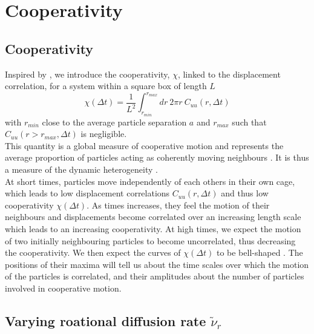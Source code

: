 \documentclass[class=report, float=false, crop=false]{standalone}
\begin{document}
\section{Cooperativity}
\label{section:cooperativity}

\subsection{Cooperativity}

Inspired by \cite{wysocki2014cooperative, doliwa2000cooperativity}, we introduce the cooperativity, $\chi$, linked to the displacement correlation, for a system within a square box of length $L$
\begin{equation}
\chi(\Delta t) = \frac{1}{L^2} \int_{r_{min}}^{r_{max}} dr~ 2\pi r~ C_{uu}(r, \Delta t)
\label{chi}
\end{equation}
with $r_{min}$ close to the average particle separation $a$ and $r_{max}$ such that $C_{uu}(r > r_{max}, \Delta t)$ is negligible.\\

This quantity is a global measure of cooperative motion and represents the average proportion of particles acting as coherently moving neighbours \cite{doliwa2000cooperativity}. It is thus a measure of the dynamic heterogeneity \cite{cavagna2009supercooled}.\\

At short times, particles move independently of each others in their own cage, which leads to low displacement correlations $C_{uu}(r, \Delta t)$ and thus low cooperativity $\chi(\Delta t)$. As times increases, they feel the motion of their neighbours and displacements become correlated over an increasing length scale which leads to an increasing cooperativity. At high times, we expect the motion of two initially neighbouring particles to become uncorrelated, thus decreasing the cooperativity. We then expect the curves of $\chi(\Delta t)$ to be bell-shaped \cite{wysocki2014cooperative, cavagna2009supercooled}. The positions of their maxima will tell us about the time scales over which the motion of the particles is correlated, and their amplitudes about the number of particles involved in cooperative motion.

\subsection{Varying roational diffusion rate $\tilde{\nu}_r$}
\end{document}
